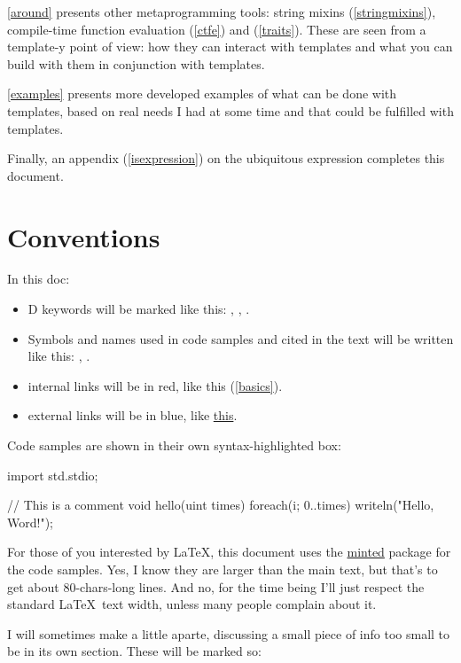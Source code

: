 \autoref{around} presents other meta\-pro\-gram\-ming tools: string mixins (\ref{stringmixins}), compile-time function evaluation (\ref{ctfe}) and  (\ref{traits}). These are seen from a template-y point of view: how they can interact with templates and what you can build with them in conjunction with templates.

\autoref{examples} presents more developed examples of what can be done with templates, based on real needs I had at some time and that could be fulfilled with templates.

Finally, an appendix (\autoref{isexpression}) on the ubiquitous  expression  completes this document.

\section*{Conventions}

In this doc:

\begin{itemize}
\item D keywords will be marked like this: , , .
\item Symbols and names used in code samples and cited in the text will be written like this: , .
\item internal links will be in red, like this (\ref{basics}).
\item external links will be in blue, like \href{http://www.dlang.org}{this}.
\end{itemize}

Code samples are shown in their own syntax-highlighted box:

\begin{dcode}
import std.stdio;

// This is a comment
void hello(uint times)
{
    foreach(i; 0..times) writeln("Hello, Word!");
}
\end{dcode}

For those of you interested by \LaTeX, this document uses the \href{http://code.google.com/p/minted/}{minted} package for the code samples. Yes, I know they are larger than the main text, but that's to get about 80-chars-long lines. And no, for the time being I'll just respect the standard \LaTeX\ text width, unless many people complain about it.

I will sometimes make a little aparte, discussing a small piece of info too small to be in its own section. These will be marked so:

